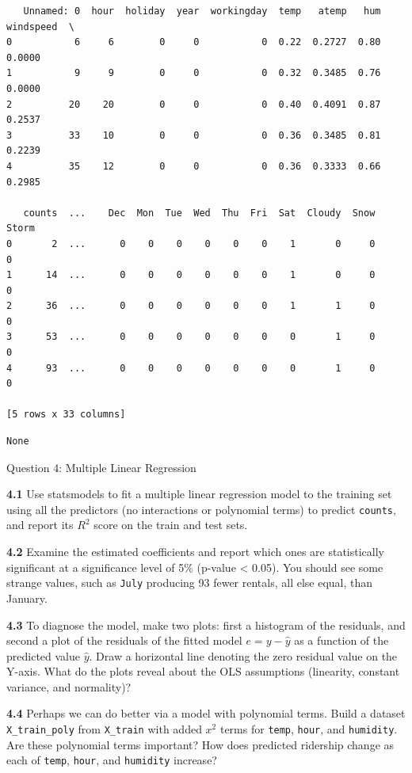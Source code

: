 \documentclass[11pt]{article}
\begin{document}
    
    
    \begin{verbatim}
   Unnamed: 0  hour  holiday  year  workingday  temp   atemp   hum  windspeed  \
0           6     6        0     0           0  0.22  0.2727  0.80     0.0000   
1           9     9        0     0           0  0.32  0.3485  0.76     0.0000   
2          20    20        0     0           0  0.40  0.4091  0.87     0.2537   
3          33    10        0     0           0  0.36  0.3485  0.81     0.2239   
4          35    12        0     0           0  0.36  0.3333  0.66     0.2985   

   counts  ...    Dec  Mon  Tue  Wed  Thu  Fri  Sat  Cloudy  Snow  Storm  
0       2  ...      0    0    0    0    0    0    1       0     0      0  
1      14  ...      0    0    0    0    0    0    1       0     0      0  
2      36  ...      0    0    0    0    0    0    1       1     0      0  
3      53  ...      0    0    0    0    0    0    0       1     0      0  
4      93  ...      0    0    0    0    0    0    0       1     0      0  

[5 rows x 33 columns]
    \end{verbatim}

    
    
    \begin{verbatim}
None
    \end{verbatim}

    
     Question 4: Multiple Linear Regression

\textbf{4.1} Use statsmodels to fit a multiple linear regression model
to the training set using all the predictors (no interactions or
polynomial terms) to predict \texttt{counts}, and report its \(R^2\)
score on the train and test sets.

\textbf{4.2} Examine the estimated coefficients and report which ones
are statistically significant at a significance level of 5\% (p-value
\textless{} 0.05). You should see some strange values, such as
\texttt{July} producing 93 fewer rentals, all else equal, than January.

\textbf{4.3} To diagnose the model, make two plots: first a histogram of
the residuals, and second a plot of the residuals of the fitted model
\({e} = y - \hat{y}\) as a function of the predicted value \(\hat{y}\).
Draw a horizontal line denoting the zero residual value on the Y-axis.
What do the plots reveal about the OLS assumptions (linearity, constant
variance, and normality)?

\textbf{4.4} Perhaps we can do better via a model with polynomial terms.
Build a dataset \texttt{X\_train\_poly} from \texttt{X\_train} with
added \(x^2\) terms for \texttt{temp}, \texttt{hour}, and
\texttt{humidity}. Are these polynomial terms important? How does
predicted ridership change as each of \texttt{temp}, \texttt{hour}, and
\texttt{humidity} increase?
\end{document}
